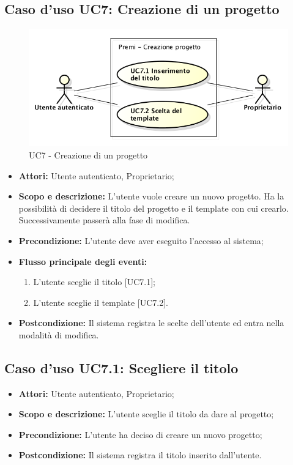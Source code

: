 \subsection{Caso d'uso UC7: Creazione di un progetto}
\begin{figure}[h] 
	\centering 
	\includegraphics[scale=0.45] {img/UC7.png} 
	\caption{UC7 - Creazione di un progetto} 
\end{figure}

\begin{itemize}
	\item \textbf{Attori:} Utente autenticato, Proprietario;
	\item \textbf{Scopo e descrizione:} L'utente vuole creare un nuovo progetto. Ha la possibilità di decidere il titolo del progetto e il template con cui crearlo. Successivamente passerà alla fase di modifica.
	\item \textbf{Precondizione:} L'utente deve aver eseguito l'accesso al sistema;
	\item \textbf{Flusso principale degli eventi:}
	\begin{enumerate}
		\item L'utente sceglie il titolo [UC7.1];
		\item L'utente sceglie il template [UC7.2].
	\end{enumerate}
	\item \textbf{Postcondizione:} Il sistema registra le scelte dell'utente ed entra nella modalità di modifica.
\end{itemize}


\subsection{Caso d'uso UC7.1: Scegliere il titolo}
\begin{itemize}
	\item \textbf{Attori:} Utente autenticato, Proprietario;
	\item \textbf{Scopo e descrizione:} L'utente sceglie il titolo da dare al progetto;
	\item \textbf{Precondizione:} L'utente ha deciso di creare un nuovo progetto;
	\item \textbf{Postcondizione:} Il sistema registra il titolo inserito dall'utente.
\end{itemize}



